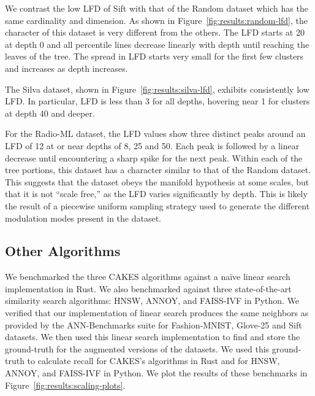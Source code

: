 We contrast the low LFD of Sift with that of the Random dataset which has the same cardinality and dimension. As shown in Figure~\ref{fig:results:random-lfd}, the character of this dataset is very different from the others.
The LFD starts at 20 at depth 0 and all percentile lines decrease linearly with depth until reaching the leaves of the tree.
The spread in LFD starts very small for the first few clusters and increases as depth increases.

The Silva dataset, shown in Figure~\ref{fig:results:silva-lfd}, exhibits consistently low LFD.
In particular, LFD is less than 3 for all depths, hovering near 1 for clusters at depth 40 and deeper.

For the Radio-ML dataset, the LFD values show three distinct peaks around an LFD of 12 at or near depths of 8, 25 and 50.
Each peak is followed by a linear decrease until encountering a sharp spike for the next peak.
Within each of the tree portions, this dataset has a character similar to that of the Random dataset.
This suggests that the dataset obeys the manifold hypothesis at some scales, but that it is not ``scale free,'' as the LFD varies significantly by depth.
This is likely the result of a piecewise uniform sampling strategy used to generate the different modulation modes present in the dataset.

\subsection{Other Algorithms}
\label{sec:datasets-and-benchmarks:other-algorithms}

We benchmarked the three CAKES algorithms against a na\"ive linear search implementation in Rust.
We also benchmarked against three state-of-the-art similarity search algorithms: HNSW, ANNOY, and FAISS-IVF in Python.
We verified that our implementation of linear search produces the same neighbors as provided by the ANN-Benchmarks suite for Fashion-MNIST, Glove-25 and Sift datasets.
We then used this linear search implementation to find and store the ground-truth for the augmented versions of the datasets.
We used this ground-truth to calculate recall for CAKES's algorithms in Rust and for HNSW, ANNOY, and FAISS-IVF in Python.
We plot the results of these benchmarks in Figure~\ref{fig:results:scaling-plots}.
